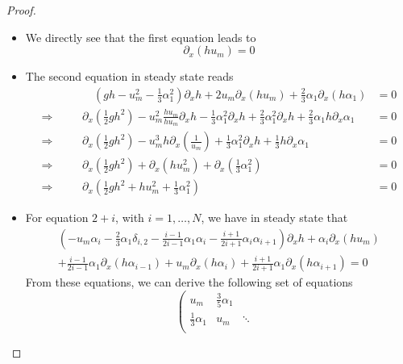 \documentclass[a4paper, 11pt]{article}
\begin{document}
\begin{proof}
    \begin{itemize}
    \item[$(1)$] We directly see that the first equation leads to
    \begin{equation}
        \partial_x\left( h u_m \right) = 0
    \end{equation}
    \item[$(2)$] The second equation in steady state reads
    \begin{align}
        &&\quad\left(gh - u_m^2 - \frac{1}{3}\alpha_1^2\right)\partial_x h + 2 u_m \partial_x\left( h u_m \right) + \frac{2}{3} \alpha_1 \partial_x\left( h \alpha_1 \right) &= 0 \\
        \Rightarrow\quad && \partial_x \left( \frac{1}{2}gh^2 \right) - u_m^2 \frac{h u_m}{h u_m} \partial_x h - \frac{1}{3} \alpha_1^2 \partial_x h + \frac{2}{3} \alpha_1^2 \partial_x h + \frac{2}{3} \alpha_1 h \partial_x \alpha_1 &= 0 \\
        \Rightarrow\quad && \partial_x \left( \frac{1}{2}gh^2 \right) - u_m^3 h \partial_x \left( \frac{1}{u_m} \right) + \frac{1}{3} \alpha_1^2 \partial_x h + \frac{1}{3} h \partial_x \alpha_1 &= 0 \\
        \Rightarrow\quad && \partial_x \left( \frac{1}{2}gh^2 \right) + \partial_x \left( h u_m^2 \right) + \partial_x \left( \frac{1}{3} \alpha_1^2 \right) &= 0 \\
        \Rightarrow\quad && \partial_x \left( \frac{1}{2}gh^2 + h u_m^2 + \frac{1}{3} \alpha_1^2 \right) &= 0
    \end{align}
    \item[$(2+i)$] For equation $2+i$, with $i=1,\ldots, N$, we have in steady state that
    \begin{eqnarray}
        \left(-u_m \alpha_i - \frac{2}{3} \alpha_1 \delta_{i,2}- \frac{i-1}{2i-1}\alpha_1 \alpha_i - \frac{i+1}{2i+1} \alpha_i \alpha_{i+1} \right)\partial_x h + \alpha_i \partial_x\left( h u_m \right) \nonumber \\
        + \frac{i-1}{2i-1} \alpha_1 \partial_x\left( h \alpha_{i-1} \right) + u_m \partial_x\left( h \alpha_{i} \right) + \frac{i+1}{2i+1} \alpha_1 \partial_x\left( h \alpha_{i+1} \right)= 0
    \end{eqnarray}
    From these equations, we can derive the following set of equations
    \begin{equation}
        \left(\begin{array}{cccc}
        u_m & \frac{3}{5}\alpha_1 & &  \\
        \frac{1}{3}\alpha_1 & u_m & \ddots &  \\

\end{array}
\end{equation}
\end{itemize}
\end{proof}
\end{document}
